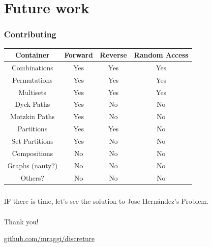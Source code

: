 \documentclass[spanish,professionalfonts]{beamer}
\def\tcr#1{\textcolor{MyRed}{#1}}
\def\tcg#1{\textcolor{MyGreen}{#1}}
\begin{document}
\section{Future work}

\begin{frame}\frametitle{Contributing}
\begin{center}
	\begin{tabular}{|c|c|c|c|}
	\hline
	 \textbf{Container} & \textbf{Forward} & \textbf{Reverse} & \textbf{Random Access} \\
	\hline
		Combinations	&  \tcg{Yes}  & \tcg{Yes} & \tcg{Yes}  \\
        Permutations	&  \tcg{Yes}  & \tcg{Yes} & \tcg{Yes}  \\
        Multisets		&  \tcg{Yes}  & \tcg{Yes} & \tcg{Yes}  \\
        Dyck Paths		&  \tcg{Yes}  & \tcr{No } & \tcr{No }  \\
        Motzkin Paths	&  \tcg{Yes}  & \tcr{No } & \tcr{No }  \\ 
        Partitions		&  \tcg{Yes}  & \tcg{Yes} & \tcr{No }  \\ 
        Set Partitions	&  \tcg{Yes}  & \tcr{No } & \tcr{No }  \\
        Compositions    &  \tcr{No }  & \tcr{No } & \tcr{No }  \\
        Graphs (nauty?) &  \tcr{No }  & \tcr{No } & \tcr{No }  \\
        Others? &  \tcr{No }  & \tcr{No } & \tcr{No }  \\
	\hline
	\end{tabular}
\end{center}

\end{frame}

\begin{frame}\frametitle{}
 IF there is time, let's see the solution to Jose Hernández's Problem.
 
 \href{file:/home/mraggi/Dropbox/sources/Mathematics/TestBedForDiscreture/main.cpp}{}
 
\end{frame}

\begin{frame}\frametitle{}
\begin{center}
	\huge{Thank you!}
\end{center}
	
	
\huge{\url{github.com/mraggi/discreture}}
\end{frame}
\end{document}
